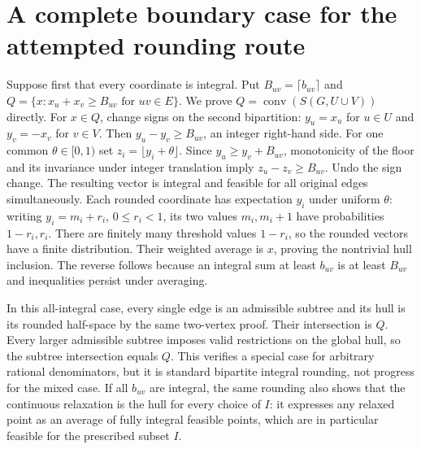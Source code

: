 \documentclass[11pt]{article}
\begin{document}
\section{A complete boundary case for the attempted rounding route}
Suppose first that every coordinate is integral. Put
$B_{uv}=\lceil b_{uv}\rceil$ and
$Q=\{x:x_u+x_v\ge B_{uv}\text{ for }uv\in E\}$.
We prove $Q=\operatorname{conv}(S(G,U\cup V))$ directly.
For $x\in Q$, change signs on the second bipartition: $y_u=x_u$ for
$u\in U$ and $y_v=-x_v$ for $v\in V$. Then
$y_u-y_v\ge B_{uv}$, an integer right-hand side.
For one common $\theta\in[0,1)$ set $z_i=\lfloor y_i+\theta\rfloor$.
Since $y_u\ge y_v+B_{uv}$, monotonicity of the floor and its invariance
under integer translation imply $z_u-z_v\ge B_{uv}$.
Undo the sign change. The resulting vector is integral and feasible for
all original edges simultaneously. Each rounded coordinate has expectation
$y_i$ under uniform $\theta$: writing $y_i=m_i+r_i$, $0\le r_i<1$,
its two values $m_i,m_i+1$ have probabilities $1-r_i,r_i$.
There are finitely many threshold values $1-r_i$, so the rounded vectors
have a finite distribution. Their weighted average is $x$, proving the
nontrivial hull inclusion. The reverse follows because an integral sum
at least $b_{uv}$ is at least $B_{uv}$ and inequalities persist under averaging.

In this all-integral case, every single edge is an admissible subtree and
its hull is its rounded half-space by the same two-vertex proof. Their
intersection is $Q$. Every larger admissible subtree imposes valid
restrictions on the global hull, so the subtree intersection equals $Q$.
This verifies a special case for arbitrary rational denominators, but it
is standard bipartite integral rounding, not progress for the mixed case.
If all $b_{uv}$ are integral, the same rounding also shows that the
continuous relaxation is the hull for every choice of $I$: it expresses
any relaxed point as an average of fully integral feasible points, which
are in particular feasible for the prescribed subset $I$.
\end{document}
